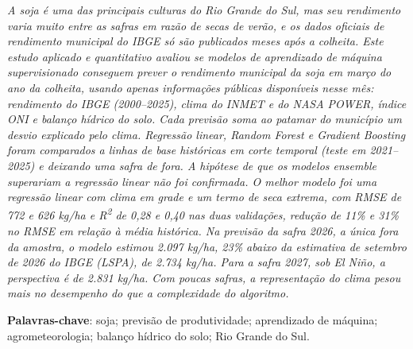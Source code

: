 \documentclass[
	article,			%
	11pt,				%
	oneside,			%
	a4paper,			%
	english,			%
	brazil,				%
	sumario=tradicional
	]{abntex2}
\begin{document}
\frenchspacing

\maketitle

\begin{resumoumacoluna}
\textit{A soja é uma das principais culturas do Rio Grande do Sul, mas seu rendimento varia muito entre as safras em razão de secas de verão, e os dados oficiais de rendimento municipal do IBGE só são publicados meses após a colheita. Este estudo aplicado e quantitativo avaliou se modelos de aprendizado de máquina supervisionado conseguem prever o rendimento municipal da soja em março do ano da colheita, usando apenas informações públicas disponíveis nesse mês: rendimento do IBGE (2000--2025), clima do INMET e do NASA POWER, índice ONI e balanço hídrico do solo. Cada previsão soma ao patamar do município um desvio explicado pelo clima. Regressão linear, Random Forest e Gradient Boosting foram comparados a linhas de base históricas em corte temporal (teste em 2021--2025) e deixando uma safra de fora. A hipótese de que os modelos ensemble superariam a regressão linear não foi confirmada. O melhor modelo foi uma regressão linear com clima em grade e um termo de seca extrema, com RMSE de 772 e 626 kg/ha e R\textsuperscript{2} de 0,28 e 0,40 nas duas validações, redução de 11\% e 31\% no RMSE em relação à média histórica. Na previsão da safra 2026, a única fora da amostra, o modelo estimou 2.097 kg/ha, 23\% abaixo da estimativa de setembro de 2026 do IBGE (LSPA), de 2.734 kg/ha. Para a safra 2027, sob El Niño, a perspectiva é de 2.831 kg/ha. Com poucas safras, a representação do clima pesou mais no desempenho do que a complexidade do algoritmo.}

 \vspace{\onelineskip}

 \noindent
 \textbf{Palavras-chave}: soja; previsão de produtividade; aprendizado de máquina; agrometeorologia; balanço hídrico do solo; Rio Grande do Sul.
\end{resumoumacoluna}
\end{document}
